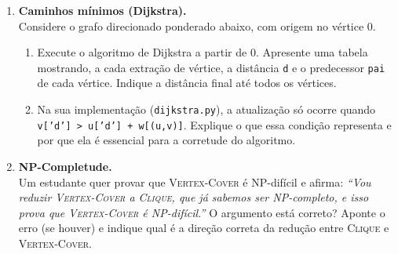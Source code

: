 \documentclass[10pt,a4paper]{extarticle}
\begin{document}
\begin{enumerate}[label=\textbf{\arabic*.}, itemsep=0.7cm, leftmargin=*]
\item \textbf{Caminhos mínimos (Dijkstra).} \\
Considere o grafo direcionado ponderado abaixo, com origem no vértice $0$.

\begin{center}
\end{center}

\begin{enumerate}[label=(\alph*)]
    \item Execute o algoritmo de Dijkstra a partir de $0$. Apresente uma tabela mostrando, a cada extração de vértice, a distância \texttt{d} e o predecessor \texttt{pai} de cada vértice. Indique a distância final até todos os vértices.
    \item Na sua implementação (\texttt{dijkstra.py}), a atualização só ocorre quando \texttt{v['d'] > u['d'] + w[(u,v)]}. Explique o que essa condição representa e por que ela é essencial para a corretude do algoritmo.
\end{enumerate}

\item \textbf{NP-Completude.} \\
Um estudante quer provar que \textsc{Vertex-Cover} é NP-difícil e afirma: \textit{``Vou reduzir \textsc{Vertex-Cover} a \textsc{Clique}, que já sabemos ser NP-completo, e isso prova que \textsc{Vertex-Cover} é NP-difícil.''} O argumento está correto? Aponte o erro (se houver) e indique qual é a direção correta da redução entre \textsc{Clique} e \textsc{Vertex-Cover}.


\end{enumerate}
\end{document}
